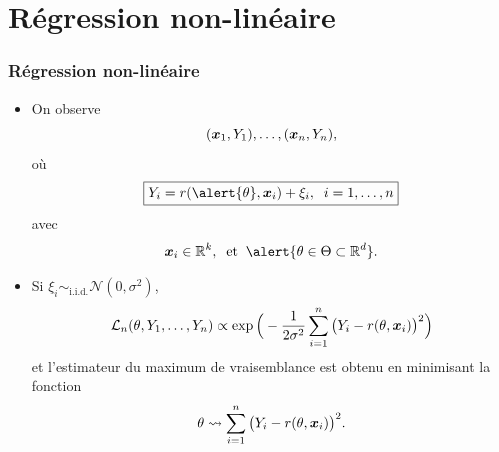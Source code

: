 %





\section{Régression non-linéaire}


\begin{frame}
\frametitle{Régression non-linéaire}
\begin{itemize}
\item On observe
$$(\operatorname{\boldsymbol{x}}_1,Y_1),\ldots, (\operatorname{\boldsymbol{x}}_n,Y_n),$$
où
$$\boxed{Y_i = r(\alert{\truetheta},\bx_i)+\xi_i,\;\;i=1,\ldots,n}$$
avec
$$\bx_i\in \R^k,\;\;\text{et}\;\; \alert{\truetheta \in \Theta \subset \R^d}.$$
\item Si $\xi_i \sim_{\text{i.i.d.}} {\mathcal N}(0,\sigma^2)$,
$${\mathcal L}_n(\theta, Y_1,\ldots, Y_n) \propto \exp\Big(-\frac{1}{2\sigma^2}\sum_{i = 1}^n\big(Y_i-r(\theta,\operatorname{\boldsymbol{x}}_i)\big)^2\Big)$$
et l'estimateur du \alert{maximum de vraisemblance} est obtenu en minimisant la fonction
$$\theta \leadsto \sum_{i = 1}^n\big(Y_i-r(\theta,\operatorname{\boldsymbol{x}}_i)\big)^2.$$
\end{itemize}
\end{frame}


